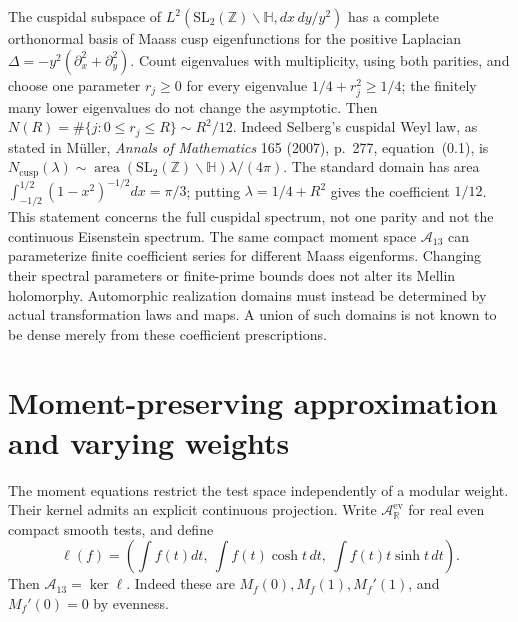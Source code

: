 \begin{remark}
\label{v4-arith:w6-b:rem:maass-union}
The cuspidal subspace of $L^2(\mathrm{SL}_2(\mathbb Z)\backslash
\mathbb H,dx\,dy/y^2)$ has a complete orthonormal basis of Maass
cusp eigenfunctions for the positive Laplacian
$\Delta=-y^2(\partial_x^2+\partial_y^2)$.
Count eigenvalues with multiplicity, using both parities, and choose
one parameter $r_j\ge0$ for every eigenvalue $1/4+r_j^2\ge1/4$;
the finitely many lower eigenvalues do not change the asymptotic.
Then $N(R)=\#\{j:0\le r_j\le R\}\sim R^2/12$.
Indeed Selberg's cuspidal Weyl law, as stated in M\"uller,
\emph{Annals of Mathematics} 165 (2007), p.~277, equation~(0.1),
is $N_{\mathrm{cusp}}(\lambda)\sim
\operatorname{area}(\mathrm{SL}_2(\mathbb Z)\backslash\mathbb H)
\lambda/(4\pi)$. The standard domain has area
$\int_{-1/2}^{1/2}(1-x^2)^{-1/2}dx=\pi/3$;
putting $\lambda=1/4+R^2$ gives the coefficient $1/12$.
This statement concerns the full cuspidal spectrum, not one parity
and not the continuous Eisenstein spectrum.
The same compact moment space $\mathscr A_{13}$ can parameterize
finite coefficient series for different Maass eigenforms.
Changing their spectral parameters or finite-prime bounds does not
alter its Mellin holomorphy. Automorphic realization domains must
instead be determined by actual transformation laws and maps.
A union of such domains is not known to be dense merely from
these coefficient prescriptions.
\end{remark}

\section{Moment-preserving approximation and varying weights}
\label{v4-arith:w6-b:construction-II}
\label{v4-arith:w6-b:construction-II:family}

The moment equations restrict the test space independently of a
modular weight. Their kernel admits an explicit continuous projection.
Write $\mathscr A_{\mathbb R}^{\mathrm{ev}}$ for real even compact smooth
tests, and define
\[
 \ell(f)=\left(\int f(t)dt,\ \int f(t)\cosh t\,dt,
                   \ \int f(t)t\sinh t\,dt\right).
\]
Then $\mathscr A_{13}=\ker\ell$. Indeed these are
$M_f(0),M_f(1),M_f'(1)$, and $M_f'(0)=0$ by evenness.

